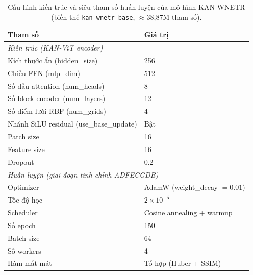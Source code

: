 \documentclass[../DoAn.tex]{subfiles}
\begin{document}

\begin{table}[htbp]
  \centering
  \caption{Cấu hình kiến trúc và siêu tham số huấn luyện của mô hình KAN-WNETR (biến thể
  \texttt{kan\_wnetr\_base}, $\approx$38{,}87M tham số).}
  \begin{tabular}{|l|l|}
    \hline
    \textbf{Tham số} & \textbf{Giá trị}\\\hline
    \multicolumn{2}{|l|}{\textit{Kiến trúc (KAN-ViT encoder)}}\\\hline
    Kích thước ẩn (hidden\_size) & 256 \\\hline
    Chiều FFN (mlp\_dim) & 512 \\\hline
    Số đầu attention (num\_heads) & 8 \\\hline
    Số block encoder (num\_layers) & 12 \\\hline
    Số điểm lưới RBF (num\_grids) & 4 \\\hline
    Nhánh SiLU residual (use\_base\_update) & Bật \\\hline
    Patch size & 16 \\\hline
    Feature size & 16 \\\hline
    Dropout & 0.2 \\\hline
    \multicolumn{2}{|l|}{\textit{Huấn luyện (giai đoạn tinh chỉnh ADFECGDB)}}\\\hline
    Optimizer & AdamW (weight\_decay $=0.01$) \\\hline
    Tốc độ học & $2\times10^{-5}$ \\\hline
    Scheduler & Cosine annealing + warmup \\\hline
    Số epoch & 150 \\\hline
    Batch size & 64 \\\hline
    Số workers & 4 \\\hline
    Hàm mất mát & Tổ hợp (Huber + SSIM) \\\hline
  \end{tabular}
  \label{tab:hyper}
\end{table}
\end{document}
